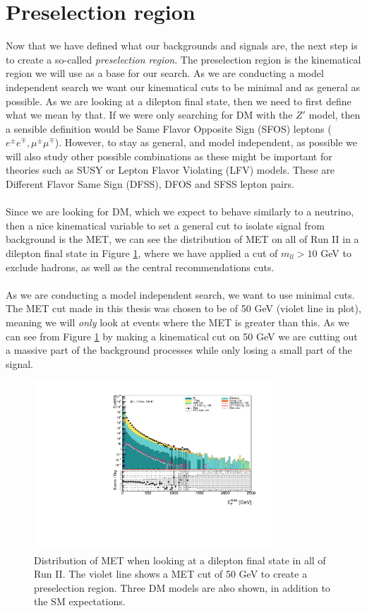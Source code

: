 \documentclass[12pt, a4paper]{book}
\begin{document}
\section{Preselection region}
Now that we have defined what our backgrounds and signals are, the next step is to create a so-called \textit{preselection region}. The preselection region is the kinematical region we will use as a base for our search. As we are conducting a model independent search we want 
our kinematical cuts to be minimal and as general as possible. As we are looking at a dilepton final state, then we need to first define what we mean by that. If we were only searching for DM with the $Z'$ model, then a sensible definition would be 
Same Flavor Opposite Sign (SFOS) leptons ($e^\pm e^\mp, \mu^\pm\mu^\mp$). However, to stay as general, and model independent, as possible we will also study other possible combinations as these might be important for theories such as SUSY or Lepton Flavor Violating 
(LFV) models. These are Different Flavor Same Sign (DFSS), DFOS and SFSS lepton pairs.\\
\\Since we are looking for DM, which we expect to behave similarly to a neutrino, then a nice kinematical variable to set a general cut to isolate signal from background is the MET, we can see the 
distribution of MET on all of Run II in a dilepton final state in Figure \ref{fig:uncut_met}, where we have applied a cut of $m_{ll}>10$ GeV to exclude hadrons, as well as the central recommendations cuts.\\
\\As we are conducting a model independent search, we want to use minimal cuts. The MET cut made in this thesis was chosen to be of 50 GeV (violet line in plot), meaning we will \textit{only} look at events where the MET is greater than this. As we can see from Figure \ref{fig:uncut_met} 
by making a kinematical cut on 50 GeV we are cutting out a massive part of the background processes while only losing a small part of the signal. \\
\graphicspath{{../../../Plots/Data_Analysis/SRs/Uncut/}} 
\begin{figure}[!ht]
    \centering
    \includegraphics[width=0.8\textwidth]{met.pdf}
    \caption[$E_T^{miss}$ distribution in dilepton final state Run II]{Distribution of MET when looking at a dilepton final state in all of Run II. The violet line shows a MET cut of 50 GeV to create a preselection region. Three DM models are also shown, in addition to the SM expectations.}\label{fig:uncut_met}
\end{figure}
\end{document}
